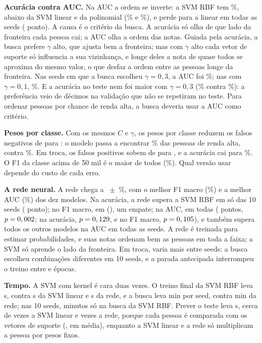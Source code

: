 \textbf{Acurácia contra AUC.} Na AUC a ordem se inverte: a SVM RBF tem \svRBFAuc\%, abaixo da SVM linear e da polinomial (\svLinAuc\% e \svPoliAuc\%), e perde para a linear em todas as seeds (\svDifRBFLinAuc{} ponto). A causa é o critério da busca. A acurácia só olha de que lado da fronteira cada pessoa cai; a AUC olha a ordem das notas. Guiada pela acurácia, a busca prefere $\gamma$ alto, que ajusta bem a fronteira; mas com $\gamma$ alto cada vetor de suporte só influencia a sua vizinhança, e longe deles a nota de quase todos se aproxima do mesmo valor, o que desfaz a ordem entre as pessoas longe da fronteira. Nas \svGTresSeeds{} seeds em que a busca escolheu $\gamma = 0{,}3$, a AUC foi \svGTresAuc\%; nas \svGUmSeeds{} com $\gamma = 0{,}1$, \svGUmAuc\%. E a acurácia no teste nem foi maior com $\gamma = 0{,}3$ (\svGTresAcc\% contra \svGUmAcc\%): a preferência veio de décimos na validação que não se repetiram no teste. Para ordenar pessoas por chance de renda alta, a busca deveria usar a AUC como critério.

\textbf{Pesos por classe.} Com os mesmos $C$ e $\gamma$, os pesos por classe reduzem os falsos negativos de \svRBFFN{} para \svPesosFN: o modelo passa a encontrar \svRecallPesos\% das pessoas de renda alta, contra \svRecallRBF\%. Em troca, os falsos positivos sobem de \svRBFFP{} para \svPesosFP, e a acurácia cai para \svPesosAcc\%. O F1 da classe acima de 50 mil é o maior de todos (\svPesosFpos\%). Qual versão usar depende do custo de cada erro.

\textbf{A rede neural.} A rede chega a \svRedeAcc~$\pm$~\svRedeSd\%, com o melhor F1 macro (\svRedeFum\%) e a melhor AUC (\svRedeAuc\%) dos dez modelos. Na acurácia, a rede supera a SVM RBF em só \svSeedsRedeRBFAcc{} das 10 seeds (\svDifRedeRBFAcc{} ponto); no F1 macro, em \svSeedsRedeRBFFum{} (\svDifRedeRBFFum), um empate; na AUC, em todas (\svDifRedeRBFAuc{} pontos, $p = 0,002$; na acurácia, $p = 0,129$, e no F1 macro, $p = 0,105$), e também supera todos os outros modelos na AUC em todas as seeds. A rede é treinada para estimar probabilidades, e suas notas ordenam bem as pessoas em toda a faixa; a SVM só aprende o lado da fronteira. Em troca, varia mais entre seeds: a busca escolheu \svRedeComb{} combinações diferentes em 10 seeds, e a parada antecipada interrompeu o treino entre \svRedeEpMin{} e \svRedeEpMax{} épocas.

\textbf{Tempo.} A SVM com kernel é cara duas vezes. O treino final da SVM RBF leva \svRBFTreino{} s, contra \svLinTreino{} s da SVM linear e \svRedeTreino{} s da rede, e a busca leva \svRBFBusca{} min por seed, contra \svRedeBusca{} min da rede; nas 10 seeds, \svBuscaTotalRBF{} minutos só na busca da SVM RBF. Prever o teste leva \svRBFPrevS{} s, cerca de \svRazaoPrevRBFLin{} vezes a SVM linear e \svRazaoPrevRBFRede{} vezes a rede, porque cada pessoa é comparada com os vetores de suporte (\svRBFVet{}, em média), enquanto a SVM linear e a rede só multiplicam a pessoa por pesos fixos.
